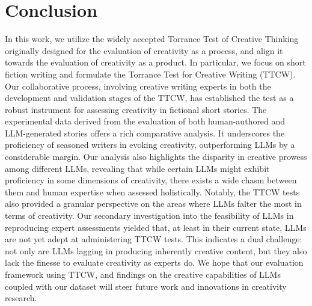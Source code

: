 \section{Conclusion}

In this work, we utilize the widely accepted Torrance Test of Creative Thinking originally designed for the evaluation of creativity as a process, and align it towards the evaluation of creativity as a product. In particular, we focus on short fiction writing and formulate the Torrance Test for Creative Writing (TTCW). Our collaborative process, involving creative writing experts in both the development and validation stages of the TTCW, has established the test as a robust instrument for assessing creativity in fictional short stories. The experimental data derived from the evaluation of both human-authored and LLM-generated stories offers a rich comparative analysis. It underscores the proficiency of seasoned writers in evoking creativity, outperforming LLMs by a considerable margin. Our analysis also highlights the disparity in creative prowess among different LLMs, revealing that while certain LLMs might exhibit proficiency in some dimensions of creativity, there exists a wide chasm between them and human expertise when assessed holistically. Notably, the TTCW tests also provided a granular perspective on the areas where LLMs falter the most in terms of creativity. Our secondary investigation into the feasibility of LLMs in reproducing expert assessments yielded that, at least in their current state, LLMs are not yet adept at administering TTCW tests. This indicates a dual challenge: not only are LLMs lagging in producing inherently creative content, but they also lack the finesse to evaluate creativity as experts do. We hope that our evaluation framework using TTCW, and findings on the creative capabilities of LLMs coupled with our dataset will steer future work and innovations in creativity research.
